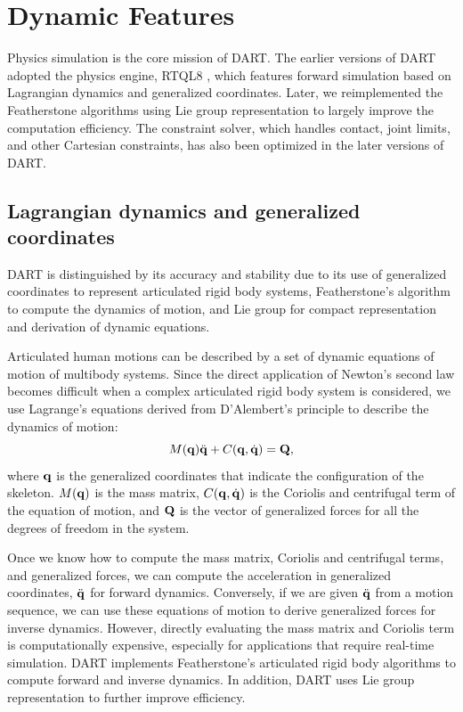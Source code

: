 \section{Dynamic Features}
Physics simulation is the core mission of DART. The earlier versions of DART
adopted the physics engine, RTQL8 \cite{}, which features forward
simulation based on Lagrangian dynamics
and generalized coordinates. Later, we reimplemented the Featherstone
algorithms using Lie group representation to largely improve the
computation efficiency. The constraint solver, which handles contact,
joint limits, and other Cartesian constraints, has also been optimized
in the later versions of DART. 

\subsection{Lagrangian dynamics and generalized coordinates}
DART is distinguished by its accuracy and stability due to its use of
generalized coordinates to represent articulated rigid body systems,
Featherstone’s algorithm to compute the dynamics of
motion, and Lie group for compact representation and derivation of
dynamic equations.

Articulated human motions can be described by a set of dynamic
equations of motion of multibody systems. Since the direct application
of Newton’s second law becomes difficult when a complex articulated
rigid body system is considered, we use Lagrange’s equations derived
from D'Alembert’s principle to describe the dynamics of motion: 
\begin{equation}
M(\mathbf{q})\ddot{\mathbf{q}} + C(\mathbf{q}, \dot{\mathbf{q}}) = \mathbf{Q},
\end{equation}
where $\mathbf{q}$ is the generalized coordinates that indicate the 
configuration of the skeleton. $M(\mathbf{q})$ is the mass matrix,
$C(\mathbf{q},\dot{\mathbf{q}})$ is the Coriolis and centrifugal term of the
equation of motion, and $\mathbf{Q}$ is the vector of generalized forces
for all the degrees of freedom in the system.

Once we know how to compute the mass matrix, Coriolis and centrifugal
terms, and generalized forces, we can compute the acceleration in
generalized coordinates, $\ddot{\mathbf{q}}$ for forward dynamics. Conversely, if we
are given $\ddot{\mathbf{q}}$ from a motion sequence, we can use these equations of
motion to derive generalized forces for inverse dynamics. However,
directly evaluating the mass matrix and Coriolis term is 
computationally expensive, especially for applications that require
real-time simulation. DART implements Featherstone's articulated rigid
body algorithms to compute forward and inverse dynamics. In addition,
DART uses Lie group representation to further improve efficiency.

